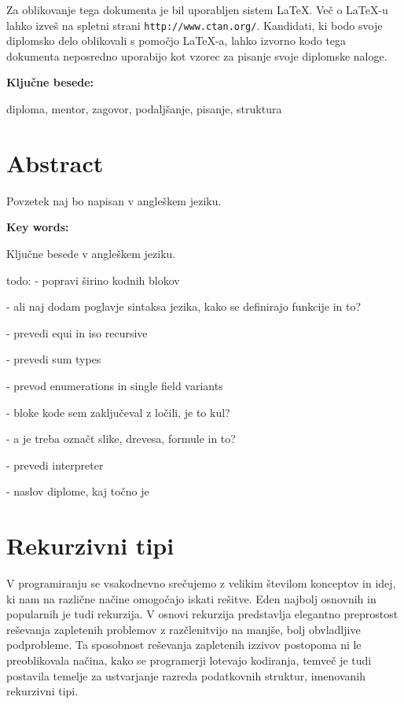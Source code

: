 \documentclass[12pt,a4paper,openany]{book}
\begin{document}
Za oblikovanje tega dokumenta je bil uporabljen sistem \LaTeX.
Ve\v c o \LaTeX-u lahko izve\v s na spletni strani \texttt{http://www.ctan.org/}.
Kandidati, ki bodo svoje diplomsko delo oblikovali s pomo\v cjo
\LaTeX-a, lahko izvorno kodo tega dokumenta neposredno uporabijo kot vzorec za pisanje svoje diplomske naloge.

\vspace{1.3cm}
\noindent
{\large \bf Ključne besede:}

\vspace{0.5cm}
\noindent
diploma, mentor, zagovor, podaljšanje, pisanje, struktura


\chapter*{Abstract}


Povzetek naj bo napisan v angleškem jeziku.

\vspace{1.3cm}
\noindent
{\large \bf Key words:}

\vspace{0.5cm}
\noindent
Ključne besede v angleškem jeziku.



todo: 
- popravi širino kodnih blokov 

- ali naj dodam poglavje sintaksa jezika, kako se definirajo funkcije in to? 

- prevedi equi in iso recursive

- prevedi sum types

- prevod enumerations in single field variants

- bloke kode sem zaključeval z ločili, je to kul?

- a je treba označt slike, drevesa, formule in to?

- prevedi interpreter

- naslov diplome, kaj točno je




\newpage
\chapter{Rekurzivni tipi}
V programiranju se vsakodnevno srečujemo z velikim številom konceptov in idej, ki nam na različne načine omogočajo iskati rešitve. Eden najbolj osnovnih in popularnih je tudi rekurzija.
V osnovi rekurzija predstavlja elegantno preprostost reševanja zapletenih problemov z razčlenitvijo na manjše, bolj obvladljive podprobleme. Ta sposobnost reševanja zapletenih izzivov 
postopoma ni le preoblikovala načina, kako se programerji lotevajo kodiranja, temveč je tudi postavila temelje za ustvarjanje razreda podatkovnih struktur, imenovanih rekurzivni tipi.
\end{document}

